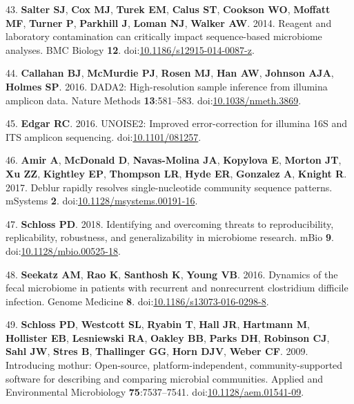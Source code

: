 \documentclass[11pt,]{article}
\begin{document}
\leavevmode\hypertarget{ref-Salter2014}{}%
43. \textbf{Salter SJ}, \textbf{Cox MJ}, \textbf{Turek EM},
\textbf{Calus ST}, \textbf{Cookson WO}, \textbf{Moffatt MF},
\textbf{Turner P}, \textbf{Parkhill J}, \textbf{Loman NJ},
\textbf{Walker AW}. 2014. Reagent and laboratory contamination can
critically impact sequence-based microbiome analyses. BMC Biology
\textbf{12}.
doi:\href{https://doi.org/10.1186/s12915-014-0087-z}{10.1186/s12915-014-0087-z}.

\leavevmode\hypertarget{ref-Callahan2016}{}%
44. \textbf{Callahan BJ}, \textbf{McMurdie PJ}, \textbf{Rosen MJ},
\textbf{Han AW}, \textbf{Johnson AJA}, \textbf{Holmes SP}. 2016. DADA2:
High-resolution sample inference from illumina amplicon data. Nature
Methods \textbf{13}:581--583.
doi:\href{https://doi.org/10.1038/nmeth.3869}{10.1038/nmeth.3869}.

\leavevmode\hypertarget{ref-Edgar2016}{}%
45. \textbf{Edgar RC}. 2016. UNOISE2: Improved error-correction for
illumina 16S and ITS amplicon sequencing.
doi:\href{https://doi.org/10.1101/081257}{10.1101/081257}.

\leavevmode\hypertarget{ref-Amir2017a}{}%
46. \textbf{Amir A}, \textbf{McDonald D}, \textbf{Navas-Molina JA},
\textbf{Kopylova E}, \textbf{Morton JT}, \textbf{Xu ZZ},
\textbf{Kightley EP}, \textbf{Thompson LR}, \textbf{Hyde ER},
\textbf{Gonzalez A}, \textbf{Knight R}. 2017. Deblur rapidly resolves
single-nucleotide community sequence patterns. mSystems \textbf{2}.
doi:\href{https://doi.org/10.1128/msystems.00191-16}{10.1128/msystems.00191-16}.

\leavevmode\hypertarget{ref-Schloss2018}{}%
47. \textbf{Schloss PD}. 2018. Identifying and overcoming threats to
reproducibility, replicability, robustness, and generalizability in
microbiome research. mBio \textbf{9}.
doi:\href{https://doi.org/10.1128/mbio.00525-18}{10.1128/mbio.00525-18}.

\leavevmode\hypertarget{ref-Seekatz2016}{}%
48. \textbf{Seekatz AM}, \textbf{Rao K}, \textbf{Santhosh K},
\textbf{Young VB}. 2016. Dynamics of the fecal microbiome in patients
with recurrent and nonrecurrent clostridium difficile infection. Genome
Medicine \textbf{8}.
doi:\href{https://doi.org/10.1186/s13073-016-0298-8}{10.1186/s13073-016-0298-8}.

\leavevmode\hypertarget{ref-Schloss2009}{}%
49. \textbf{Schloss PD}, \textbf{Westcott SL}, \textbf{Ryabin T},
\textbf{Hall JR}, \textbf{Hartmann M}, \textbf{Hollister EB},
\textbf{Lesniewski RA}, \textbf{Oakley BB}, \textbf{Parks DH},
\textbf{Robinson CJ}, \textbf{Sahl JW}, \textbf{Stres B},
\textbf{Thallinger GG}, \textbf{Horn DJV}, \textbf{Weber CF}. 2009.
Introducing mothur: Open-source, platform-independent,
community-supported software for describing and comparing microbial
communities. Applied and Environmental Microbiology
\textbf{75}:7537--7541.
doi:\href{https://doi.org/10.1128/aem.01541-09}{10.1128/aem.01541-09}.
\end{document}
